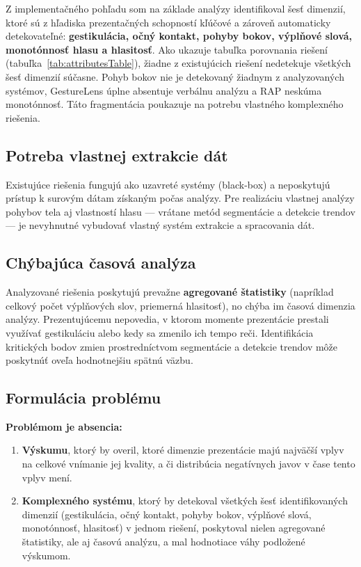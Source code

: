 Z implementačného pohľadu som na základe analýzy identifikoval šesť dimenzií, ktoré sú z hľadiska prezentačných schopností kľúčové a zároveň automaticky detekovateľné: \textbf{gestikulácia, očný kontakt, pohyby bokov, výplňové slová, monotónnosť hlasu a hlasitosť}. Ako ukazuje tabuľka porovnania riešení (tabuľka~\ref{tab:attributesTable}), žiadne z existujúcich riešení nedetekuje všetkých šesť dimenzií súčasne. Pohyb bokov nie je detekovaný žiadnym z analyzovaných systémov, GestureLens úplne absentuje verbálnu analýzu a RAP neskúma monotónnosť. Táto fragmentácia poukazuje na potrebu vlastného komplexného riešenia.

\subsection{Potreba vlastnej extrakcie dát}

Existujúce riešenia fungujú ako uzavreté systémy (black-box) a neposkytujú prístup k surovým dátam získaným počas analýzy. Pre realizáciu vlastnej analýzy pohybov tela aj vlastností hlasu --- vrátane metód segmentácie a detekcie trendov --- je nevyhnutné vybudovať vlastný systém extrakcie a spracovania dát.

\subsection{Chýbajúca časová analýza}

Analyzované riešenia poskytujú prevažne \textbf{agregované štatistiky} (napríklad celkový počet výplňových slov, priemerná hlasitosť), no chýba im časová dimenzia analýzy. Prezentujúcemu nepovedia, v ktorom momente prezentácie prestali využívať gestikuláciu alebo kedy sa zmenilo ich tempo reči. Identifikácia kritických bodov zmien prostredníctvom segmentácie a detekcie trendov môže poskytnúť oveľa hodnotnejšiu spätnú väzbu.

\subsection{Formulácia problému}

\textbf{Problémom je absencia:}

\begin{enumerate}
    \item \textbf{Výskumu}, ktorý by overil, ktoré dimenzie prezentácie majú najväčší vplyv na celkové vnímanie jej kvality, a či distribúcia negatívnych javov v čase tento vplyv mení.
    \item \textbf{Komplexného systému}, ktorý by detekoval všetkých šesť identifikovaných dimenzií (gestikulácia, očný kontakt, pohyby bokov, výplňové slová, monotónnosť, hlasitosť) v jednom riešení, poskytoval nielen agregované štatistiky, ale aj časovú analýzu, a mal hodnotiace váhy podložené výskumom.
\end{enumerate}

